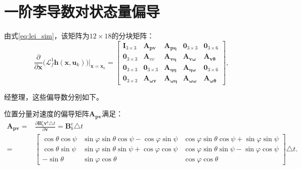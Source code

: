 
\section{一阶李导数对状态量偏导}
\label{appendix:lei}
由式\ref{eq:lei_sim}，该矩阵为$12 \times 18$的分块矩阵：
\begin{equation}
    \frac{\partial}{\partial \bm{x}}\big( \mathcal{L}_f^1 \bm{h}(\bm{x}, \bm{u}_k) \big)\Big|_{\bm{x}=\bm{x}_k} = 
    \begin{bmatrix}
        \bm{I}_{3 \times 3} & \bm{A}_{\bm{p} \bm{v}} & \bm{A}_{\bm{p} \bm{\eta}} & \bm{0}_{3 \times 3} & \bm{0}_{3 \times 6} \\
        \bm{0}_{3 \times 3} & \bm{A}_{v v} & \bm{A}_{\bm{v \eta}} & \bm{A}_{\bm{v \omega}} & \bm{A}_{\bm{v \theta}} \\
        \bm{0}_{3 \times 3} & \bm{0}_{3 \times 3} & \bm{A}_{\bm{\eta \eta}} & \bm{A}_{\bm{\eta \omega}} & \bm{0}_{3 \times 6} \\
        \bm{0}_{3 \times 3} & \bm{A}_{\bm{\omega v}} & \bm{A}_{\bm{\omega \eta}} & \bm{A}_{\bm{\omega \omega}} & \bm{A}_{\bm{\omega \theta}}
    \end{bmatrix},
\end{equation}

经整理，这些偏导数分别如下。

位置分量对速度的偏导矩阵$\bm{A}_{\bm{pv}}$满足：
\begin{equation}
    \begin{aligned}
        \bm{A}_{\bm{pv}} =& \frac{\partial \bm{B}_b^e \bm{v}^b \triangle t}{\partial \bm{v}} = \bm{B}_b^e \triangle t \\
        =& \begin{bmatrix}
            \cos\theta\cos\psi & \sin\varphi\sin\theta\cos\psi - \cos\varphi\sin\psi & \cos\varphi\sin\theta\cos\psi + \sin\varphi\sin\psi \\
            \cos\theta\sin\psi & \sin\varphi\sin\theta\sin\psi + \cos\varphi\cos\psi & \cos\varphi\sin\theta\sin\psi - \sin\varphi\cos\psi \\
            -\sin\theta & \sin\varphi\cos\theta & \cos\varphi\cos\theta
        \end{bmatrix} \triangle t.
    \end{aligned}
\end{equation}

